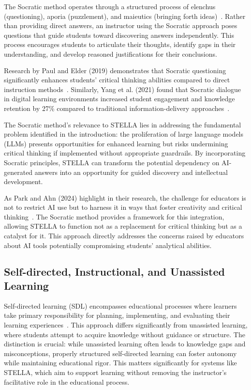 \documentclass[sigconf,natbib=true]{acmart}
\begin{document}
The Socratic method operates through a structured process of elenchus
(questioning), aporia (puzzlement), and maieutics (bringing forth ideas)~\cite{oylerFactIgnoranceRevisiting2014}. Rather than providing direct answers, an instructor using the Socratic approach poses questions that guide students toward discovering
answers independently. This process encourages students to articulate their
thoughts, identify gaps in their understanding, and develop reasoned
justifications for their conclusions.

Research by Paul and Elder (2019) demonstrates that Socratic questioning
significantly enhances students' critical thinking abilities compared to direct instruction methods~\cite{paulCriticalThinkingConcepts2019}. Similarly, Yang et al. (2021) found that Socratic dialogue in digital learning environments increased student engagement and knowledge retention by 27\% compared to traditional information-delivery approaches~\cite{yangHumancenteredArtificialIntelligence2021}.

The Socratic method's relevance to STELLA lies in addressing the fundamental problem identified in the introduction: the proliferation of large language models (LLMs) presents opportunities for enhanced learning but risks undermining critical thinking if implemented without appropriate guardrails. By incorporating Socratic principles, STELLA can transform the potential dependency on AI-generated answers into an opportunity for guided discovery and intellectual development.

As Park and Ahn (2024) highlight in their research, the challenge for educators is not to restrict AI use but to harness it in ways that foster creativity and critical thinking~\cite{parkPromisePerilChatGPT2024}. The Socratic method provides a framework for this integration, allowing STELLA to function not as a replacement for critical thinking but as a catalyst for it. This approach directly addresses the concerns raised by educators about AI tools potentially compromising students' analytical abilities.

\subsection{Self-directed, Instructional, and Unassisted Learning}
Self-directed learning (SDL) encompasses educational processes where learners take primary responsibility for planning, implementing, and evaluating their learning experiences~\cite{knowlesSelfdirectedLearningGuide1975}. This approach differs significantly from unassisted learning, where students attempt to acquire knowledge without guidance or structure. The distinction is crucial: while unassisted learning often leads to knowledge gaps and misconceptions, properly structured self-directed learning can foster autonomy while maintaining educational rigor. This matters significantly for systems like STELLA, which aim to support learning without removing the instructor's facilitative role in the educational process.
\end{document}
